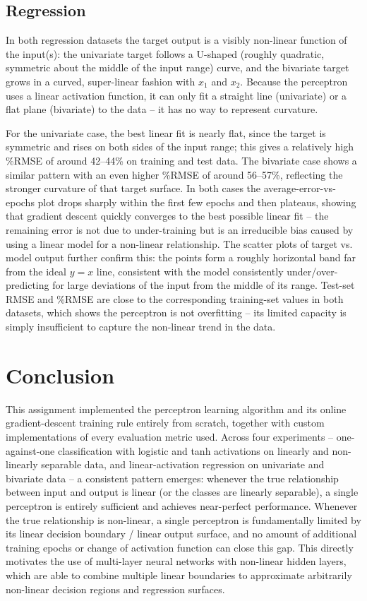 \documentclass[11pt,a4paper]{article}
\begin{document}
\subsection{Regression}
In both regression datasets the target output is a visibly non-linear function of the input(s): the univariate target follows a U-shaped (roughly quadratic, symmetric about the middle of the input range) curve, and the bivariate target grows in a curved, super-linear fashion with $x_1$ and $x_2$. Because the perceptron uses a linear activation function, it can only fit a straight line (univariate) or a flat plane (bivariate) to the data -- it has no way to represent curvature.

For the univariate case, the best linear fit is nearly flat, since the target is symmetric and rises on both sides of the input range; this gives a relatively high \%RMSE of around 42--44\% on training and test data. The bivariate case shows a similar pattern with an even higher \%RMSE of around 56--57\%, reflecting the stronger curvature of that target surface. In both cases the average-error-vs-epochs plot drops sharply within the first few epochs and then plateaus, showing that gradient descent quickly converges to the best possible linear fit -- the remaining error is not due to under-training but is an irreducible bias caused by using a linear model for a non-linear relationship. The scatter plots of target vs. model output further confirm this: the points form a roughly horizontal band far from the ideal $y=x$ line, consistent with the model consistently under/over-predicting for large deviations of the input from the middle of its range. Test-set RMSE and \%RMSE are close to the corresponding training-set values in both datasets, which shows the perceptron is not overfitting -- its limited capacity is simply insufficient to capture the non-linear trend in the data.
\clearpage

\section{Conclusion}
This assignment implemented the perceptron learning algorithm and its online gradient-descent training rule entirely from scratch, together with custom implementations of every evaluation metric used. Across four experiments -- one-against-one classification with logistic and tanh activations on linearly and non-linearly separable data, and linear-activation regression on univariate and bivariate data -- a consistent pattern emerges: whenever the true relationship between input and output is linear (or the classes are linearly separable), a single perceptron is entirely sufficient and achieves near-perfect performance. Whenever the true relationship is non-linear, a single perceptron is fundamentally limited by its linear decision boundary / linear output surface, and no amount of additional training epochs or change of activation function can close this gap. This directly motivates the use of multi-layer neural networks with non-linear hidden layers, which are able to combine multiple linear boundaries to approximate arbitrarily non-linear decision regions and regression surfaces.
\end{document}
